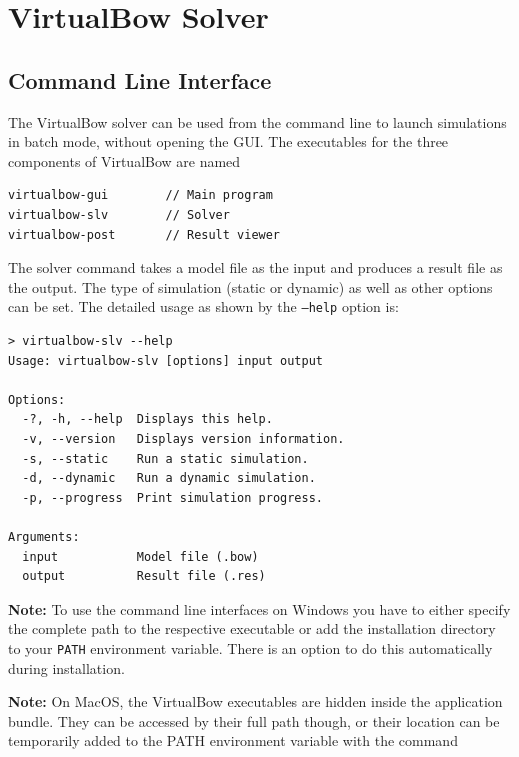 \documentclass[12pt]{article}
\begin{document}
\newpage
\section{VirtualBow Solver}

\subsection{Command Line Interface}

The VirtualBow solver can be used from the command line to launch simulations in batch mode, without opening the GUI.
The executables for the three components of VirtualBow are named

\begin{framed}
\begin{verbatim}
virtualbow-gui        // Main program
virtualbow-slv        // Solver
virtualbow-post       // Result viewer
\end{verbatim}
\end{framed}

The solver command takes a model file as the input and produces a result file as the output.
The type of simulation (static or dynamic) as well as other options can be set.
The detailed usage as shown by the \texttt{--help} option is:

\bigskip

\begin{framed}
\begin{verbatim}
> virtualbow-slv --help
Usage: virtualbow-slv [options] input output

Options:
  -?, -h, --help  Displays this help.
  -v, --version   Displays version information.
  -s, --static    Run a static simulation.
  -d, --dynamic   Run a dynamic simulation.
  -p, --progress  Print simulation progress.

Arguments:
  input           Model file (.bow)
  output          Result file (.res)
\end{verbatim}
\end{framed}

\bigskip

\textbf{Note:} To use the command line interfaces on Windows you have to either specify the complete path to the respective executable or add the installation directory to your \texttt{PATH} environment variable.
There is an option to do this automatically during installation.

\bigskip

\textbf{Note:} On MacOS, the VirtualBow executables are hidden inside the application bundle.
They can be accessed by their full path though, or their location can be temporarily added to the PATH environment variable with the command
\end{document}
